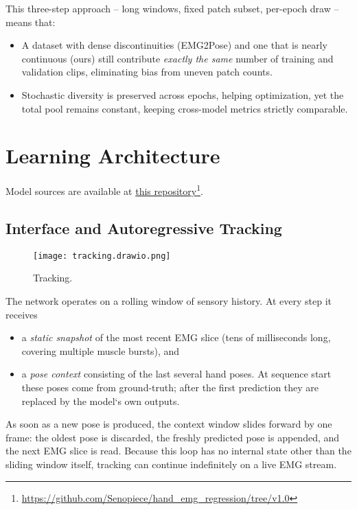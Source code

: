 This three-step approach -- long windows, fixed patch subset, per-epoch draw -- means
that:

\begin{itemize}
  \item A dataset with dense discontinuities (EMG2Pose) and one that is
        nearly continuous (ours) still contribute \emph{exactly the same}
        number of training and validation clips, eliminating bias from
        uneven patch counts.
  \item Stochastic diversity is preserved across epochs, helping optimization,
        yet the total pool remains constant, keeping cross-model metrics
        strictly comparable.
\end{itemize}

\section{Learning Architecture}

Model sources are available at \href{https://github.com/Senopiece/hand_emg_regression/tree/v1.0}{this repository}\footnote{\url{https://github.com/Senopiece/hand_emg_regression/tree/v1.0}}.

\subsection{Interface and Autoregressive Tracking}

\begin{figure}[H]
    \centering
    \texttt{[image: tracking.drawio.png]}
    \caption{Tracking.}
    \label{fig:tracking}
\end{figure}

The network operates on a rolling window of sensory history.
At every step it receives

\begin{itemize}
  \item a \emph{static snapshot} of the most recent EMG slice
        (tens of milliseconds long, covering multiple muscle bursts), and
  \item a \emph{pose context} consisting of the last several hand poses.
        At sequence start these poses come from ground-truth; after the first
        prediction they are replaced by the model`s own outputs.
\end{itemize}

As soon as a new pose is produced, the context window slides forward by one
frame: the oldest pose is discarded, the freshly predicted pose is appended,
and the next EMG slice is read.
Because this loop has no internal state other than the sliding window itself,
tracking can continue indefinitely on a live EMG stream.

